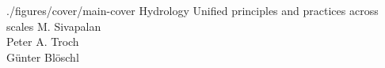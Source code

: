 \documentclass[10pt,twoside,twocolumn,openany]{book}
\begin{document}
\makebookcover
  {./figures/cover/main-cover}
  {Hydrology}
  {Unified principles and practices across scales}
  {M. Sivapalan \\ Peter A. Troch \\ Günter Blöschl}


\makecolophon{}

\pagestyle{empty}
\small
\tableofcontents
\normalsize


\pagestyle{bookheader}
















\end{document}
